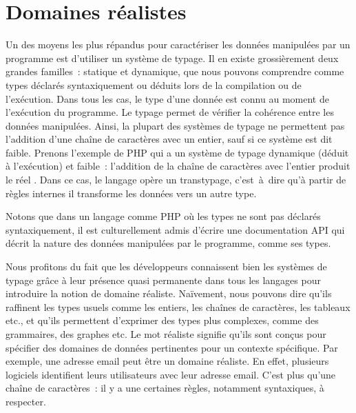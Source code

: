\section{Domaines réalistes}
\label{section:language:realdoms}

Un des moyens les plus répandus pour caractériser les données manipulées par un
programme est d'utiliser un système de {\strong typage}. Il en existe
grossièrement deux grandes familles~: {\strong statique} et {\strong dynamique},
que nous pouvons comprendre comme types déclarés syntaxiquement ou déduits lors
de la compilation ou de l'exécution. Dans tous les cas, le type d'une donnée est
connu au moment de l'{\strong exécution} du programme. Le typage permet de
{\strong vérifier} la cohérence entre les données manipulées. Ainsi, la plupart
des systèmes de typage ne permettent pas l'addition d'une chaîne de caractères
avec un entier, sauf si ce système est dit {\strong faible}. Prenons l'exemple
de PHP qui a un système de typage dynamique (déduit à l'exécution) et faible~:
l'addition de la chaîne de caractères  avec l'entier 
produit le réel . Dans ce cas, le langage opère un transtypage,
c'est~à~dire qu'à partir de règles internes il transforme les données vers un
autre type.

Notons que dans un langage comme PHP où les types ne sont pas déclarés
syntaxiquement, il est culturellement admis d'écrire une documentation API qui
décrit la nature des données manipulées par le programme, comme ses types.

Nous profitons du fait que les développeurs connaissent bien les systèmes de
typage grâce à leur présence quasi permanente dans tous les langages pour
introduire la notion de {\strong domaine réaliste}. Naïvement, nous pouvons dire
qu'ils raffinent les types usuels comme les entiers, les chaînes de caractères,
les tableaux etc., et qu'ils permettent d'exprimer des types plus complexes,
comme des grammaires, des graphes etc. Le mot {\strong réaliste} signifie qu'ils
sont conçus pour spécifier des domaines de données {\strong pertinentes} pour un
contexte {\strong spécifique}. Par exemple, une adresse email peut être un
domaine réaliste. En effet, plusieurs logiciels identifient leurs utilisateurs
avec leur adresse email. C'est plus qu'une chaîne de caractères~: il y a une
certaines règles, notamment syntaxiques, à respecter.

